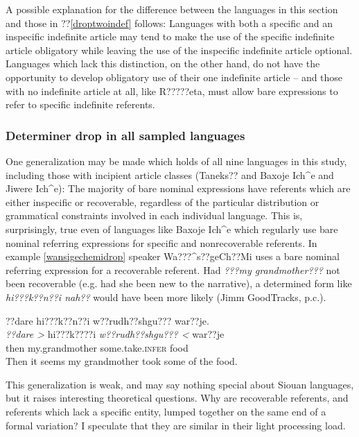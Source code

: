 \documentclass[output=paper]{LSP/langsci}
\begin{document}
A possible explanation for the difference between the languages in this section and those in ??\ref{droptwoindef} follows: Languages with both a specific and an inspecific indefinite article may tend to make the use of the specific indefinite article obligatory while leaving the use of the inspecific indefinite article optional. Languages which lack this distinction, on the other hand, do not have the opportunity to develop obligatory use of their one indefinite article -- and those with no indefinite article at all, like R?????eta, must allow bare expressions to refer to specific indefinite referents.

\subsubsection{Determiner drop in all sampled languages}\label{dropsummary}

One generalization may be made which holds of all nine languages in this study, including those with incipient article classes (Taneks?? and Baxoje Ich\^{}e and Jiwere Ich\^{}e): The majority of bare nominal expressions have referents which are either inspecific or recoverable, regardless of the particular distribution or grammatical constraints involved in each individual language. This is, surprisingly, true even of languages like Baxoje Ich\^{}e which regularly use bare nominal referring expressions for specific and nonrecoverable referents. In example \ref{wansigechemidrop} speaker Wa???\^{}s??geCh??Mi uses a bare nominal referring expression for a recoverable referent. Had \emph{???my grandmother???} not been recoverable (e.g. had she been new to the narrative), a determined form like \emph{hi???k??n??i nah??} would have been more likely (Jimm GoodTracks, p.c.).

\ea\label{wansigechemidrop}
??dare hi???k??n??i w??rudh??shgu??? war??je.\footnotemark\\
\gll	\emph{??dare >} 		hi???k????i 				\emph{w??rudh??shgu??? <}	war??je\\
	then 				my.grandmother 			some.take.\textsc{infer}	food\\
\glt	Then it seems my grandmother took some of the food.
\z

This generalization is weak, and may say nothing special about Siouan languages, but it raises interesting theoretical questions. Why are recoverable referents, and referents which lack a specific entity, lumped together on the same end of a formal variation? I speculate that they are similar in their light processing load.
\end{document}

